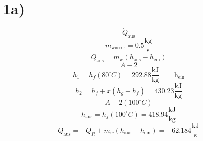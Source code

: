 

\section*{1a)}
\[
\dot{Q}_{\text{aus}}
\]
\[
\dot{m}_{\text{wasser}} = 0.5 \frac{\text{kg}}{\text{s}}
\]
\[
\dot{Q}_{\text{aus}} = \dot{m}_{\text{w}} (h_{\text{aus}} - h_{\text{ein}})
\]
\[
A-2
\]
\[
h_1 = h_f(80^\circ C) = 292.88 \frac{\text{kJ}}{\text{kg}} \quad \text{= h}_{\text{ein}}
\]
\[
h_2 = h_f + x(h_g - h_f) = 430.23 \frac{\text{kJ}}{\text{kg}}
\]
\[
A-2(100^\circ C)
\]
\[
h_{\text{aus}} = h_f(100^\circ C) = 418.94 \frac{\text{kJ}}{\text{kg}}
\]
\[
\dot{Q}_{\text{aus}} = -\dot{Q}_R + \dot{m}_w (h_{\text{aus}} - h_{\text{ein}}) = -62.184 \frac{\text{kJ}}{\text{s}}
\]